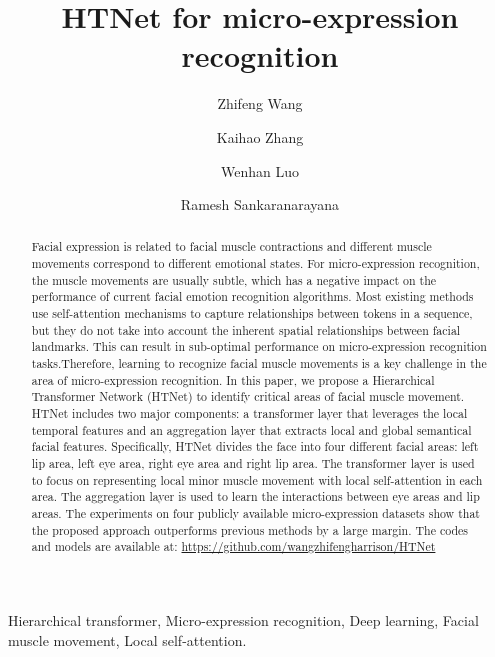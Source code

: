\documentclass[review,12pt, 3p]{elsarticle}
\begin{document}
\begin{frontmatter}







\title{HTNet for micro-expression recognition}



 \author[rvt]{Zhifeng Wang}
 \author[rvt]{Kaihao Zhang }
 \author[focal]{ Wenhan Luo}
 \author[rvt]{Ramesh Sankaranarayana}

\address[rvt]{College of Engineering and Computer Science, Australian National University, Canberra, ACT, Australia}
 \address[focal]{Sun Yat-sen University, Guangzhou, China}

\begin{abstract}
Facial expression is related to facial muscle contractions and different muscle movements correspond to different emotional states.  For micro-expression recognition, the muscle movements are usually subtle, which has a negative impact on the performance of current facial emotion recognition algorithms.  Most existing methods use self-attention mechanisms  to capture relationships between tokens in a sequence, but they do not take into account the inherent spatial relationships between facial landmarks. This can result in sub-optimal performance on  micro-expression recognition tasks.Therefore, learning to recognize facial muscle movements is a key challenge in the area of micro-expression recognition.  In this paper, we propose a Hierarchical Transformer Network (HTNet) to identify critical areas of facial muscle movement.  HTNet includes two major components: a transformer layer that leverages the local temporal features and an aggregation layer that extracts local and global semantical facial features.  Specifically, HTNet divides the face into four different facial areas: left lip area, left eye area, right eye area and right lip area.  The transformer layer is used to focus on representing local minor muscle movement with local self-attention in each area.  The aggregation layer is used to learn the interactions between eye areas and lip areas. The experiments on four publicly available micro-expression datasets show that the proposed approach outperforms previous methods by a large margin. The codes and models are available at: \url{https://github.com/wangzhifengharrison/HTNet}
\end{abstract}

\begin{keyword}




Hierarchical transformer, Micro-expression recognition,  Deep learning, Facial muscle movement,  Local self-attention.
\end{keyword}

\end{frontmatter}
\end{document}
